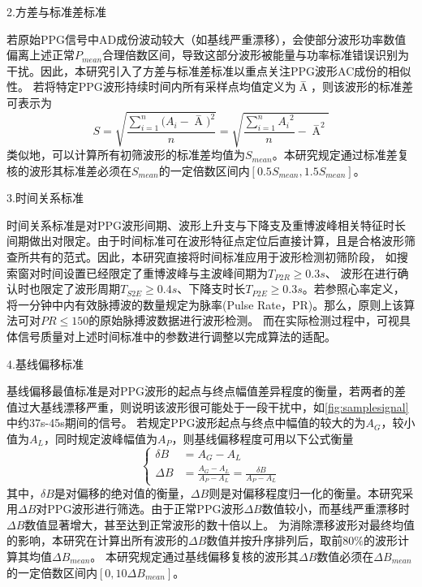 2.方差与标准差标准

若原始PPG信号中AD成份波动较大（如基线严重漂移），会使部分波形功率数值偏离上述正常$P_{mean}$合理倍数区间，导致这部分波形被能量与功率标准错误识别为干扰。因此，本研究引入了方差与标准差标准以重点关注PPG波形AC成份的相似性。
若将特定PPG波形持续时间内所有采样点均值定义为$\mathop{A} \limits^-$，则该波形的标准差可表示为
\begin{equation}
    \label{equ:ppgstd}
    S=\sqrt{\frac{\sum_{i=1}^{n}{(A_i-\mathop{A} \limits^-})^2}{n}}=\sqrt{\frac{\sum_{i=1}^n{A_i}^2}{n}-{\mathop{A} \limits^-}^2}
\end{equation}
类似地，可以计算所有初筛波形的标准差均值为$S_{mean}$。本研究规定通过标准差复核的波形其标准差必须在$S_{mean}$的一定倍数区间内$[0.5S_{mean},1.5S_{mean}]$。

3.时间关系标准

时间关系标准是对PPG波形间期、波形上升支与下降支及重博波峰相关特征时长间期做出对限定。由于时间标准可在波形特征点定位后直接计算，且是合格波形筛查所共有的范式。因此，本研究直接将时间标准应用于波形检测初筛阶段，
如搜索窗对时间设置已经限定了重博波峰与主波峰间期为$T_{P2R}\ge0.3s$、
波形在进行确认时也限定了波形周期$T_{S2E}\ge 0.4s$、下降支时长$T_{P2E}\ge 0.3s$。若参照心率定义，将一分钟中内有效脉搏波的数量规定为脉率(Pulse Rate，PR)。那么，原则上该算法可对$PR \le 150$的原始脉搏波数据进行波形检测。
而在实际检测过程中，可视具体信号质量对上述时间标准中的参数进行调整以完成算法的适配。

4.基线偏移标准

基线偏移最值标准是对PPG波形的起点与终点幅值差异程度的衡量，若两者的差值过大基线漂移严重，则说明该波形很可能处于一段干扰中，如\autoref{fig:samplesignal}中约37s-45s期间的信号。
若规定PPG波形起点与终点中幅值的较大的为$A_G$，较小值为$A_L$，同时规定波峰幅值为$A_P$，则基线偏移程度可用以下公式衡量
\begin{equation}
    \label{equ:baselinestd}
    \left \{
    \begin{aligned}
        \delta B &=A_G-A_L \\
        \Delta B &=\frac{A_G-A_L}{A_P-A_L}=\frac{\delta B}{A_P-A_L}
    \end{aligned}
    \right.
\end{equation}
其中，$\delta B$是对偏移的绝对值的衡量，$\Delta B$则是对偏移程度归一化的衡量。本研究采用$\Delta B$对PPG波形进行筛选。由于正常PPG波形$\Delta B$数值较小，而基线严重漂移时$\Delta B$数值显著增大，甚至达到正常波形的数十倍以上。
为消除漂移波形对最终均值的影响，本研究在计算出所有波形的$\Delta B$数值并按升序排列后，取前$80\%$的波形计算其均值${\Delta B}_{mean}$。
本研究规定通过基线偏移复核的波形其$\Delta B$数值必须在${\Delta B}_{mean}$的一定倍数区间内$[0,10{\Delta B}_{mean}]$。

